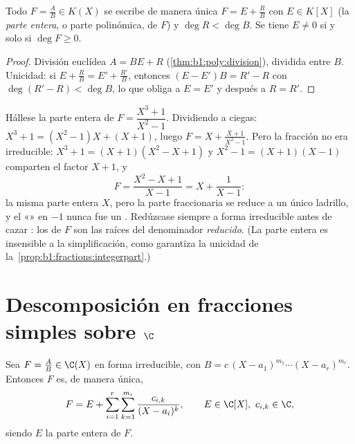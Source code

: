 \begin{proposition}\label{prop:b1:fractions:integerpart}
Todo $F = \frac AB \in K(X)$ se escribe de manera única
$F = E + \frac RB$ con $E \in K[X]$ (la \emph{parte entera}, o parte
polinómica, de $F$) y $\deg R < \deg B$. Se tiene $E \neq 0$ si y solo
si $\deg F \geq 0$.
\end{proposition}

\begin{proof}
División euclídea $A = BE + R$ (\cref{thm:b1:poly:division}), dividida
entre $B$. Unicidad: si $E + \frac RB = E' + \frac{R'}{B}$, entonces
$(E - E')B = R' - R$ con $\deg(R' - R) < \deg B$, lo que obliga a
$E = E'$ y después a $R = R'$.
\end{proof}

\begin{example}\label{ex:b1:fractions:integerpart}
Hállese la parte entera de $F = \dfrac{X^3 + 1}{X^2 - 1}$. Dividiendo a
ciegas: $X^3 + 1 = (X^2 - 1)X + (X + 1)$, luego
$F = X + \frac{X + 1}{X^2 - 1}$. Pero la fracción no era irreducible:
$X^3 + 1 = (X + 1)(X^2 - X + 1)$ y $X^2 - 1 = (X+1)(X-1)$ comparten el
factor $X + 1$, y
\[
F = \frac{X^2 - X + 1}{X - 1} = X + \frac{1}{X - 1} :
\]
la misma parte entera $X$, pero la parte fraccionaria se reduce a un
único ladrillo, y el «» en $-1$ nunca fue un . Redúzcase
siempre a forma irreducible antes de cazar : los  de $F$
son las raíces del denominador \emph{reducido}. (La parte entera es
insensible a la simplificación, como garantiza la unicidad de
la~\cref{prop:b1:fractions:integerpart}.)
\end{example}

\section{Descomposición en fracciones simples sobre $\C$}

\begin{theorem}\label{thm:b1:fractions:complex}
Sea $F = \frac AB \in \C(X)$ en forma irreducible, con
$B = c\,(X - a_1)^{m_1} \cdots (X - a_r)^{m_r}$. Entonces $F$ es, de manera única,
\[
F = E + \sum_{i=1}^{r} \sum_{k=1}^{m_i}
\frac{c_{i,k}}{(X - a_i)^k},
\qquad E \in \C[X],\ c_{i,k} \in \C ,
\]
siendo $E$ la parte entera de $F$.
\end{theorem}

